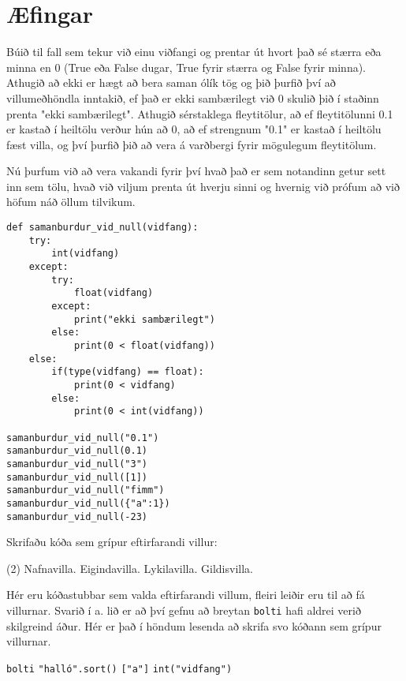 



\newpage
\section{Æfingar}
\begin{exercise}\label{vil1}
Búið til fall sem tekur við einu viðfangi og prentar út hvort það sé stærra eða minna en 0 (True eða False dugar, True fyrir stærra og False fyrir minna).
Athugið að ekki er hægt að bera saman ólík tög og þið þurfið því að villumeðhöndla inntakið, ef það er ekki sambærilegt við 0 skulið þið í staðinn prenta "ekki sambærilegt".
Athugið sérstaklega fleytitölur, að ef fleytitölunni 0.1 er kastað í heiltölu verður hún að 0, að ef strengnum "0.1" er kastað í heiltölu fæst villa, og því þurfið þið að vera á varðbergi fyrir mögulegum fleytitölum.
\end{exercise}
\begin{Answer}[ref={vil1}]
Nú þurfum við að vera vakandi fyrir því hvað það er sem notandinn getur sett inn sem tölu, hvað við viljum prenta út hverju sinni og hvernig við prófum að við höfum náð öllum tilvikum.
	\begin{lstlisting}
def samanburdur_vid_null(vidfang):
	try:
		int(vidfang)
	except:
		try:
			float(vidfang)
		except:
			print("ekki sambærilegt")
		else:
			print(0 < float(vidfang))
	else:
		if(type(vidfang) == float):
			print(0 < vidfang)
		else:
			print(0 < int(vidfang))

samanburdur_vid_null("0.1")
samanburdur_vid_null(0.1)
samanburdur_vid_null("3")
samanburdur_vid_null([1])
samanburdur_vid_null("fimm")
samanburdur_vid_null({"a":1})
samanburdur_vid_null(-23)
	\end{lstlisting}
\end{Answer}

\begin{exercise}\label{vil2}
Skrifaðu kóða sem grípur eftirfarandi villur:
	\begin{tasks}(2)
		\task\label{vil2-a} Nafnavilla.  
		\task\label{vil2-b} Eigindavilla.
		\task\label{vil2-c} Lykilavilla.
		\task\label{vil2-d} Gildisvilla.
	\end{tasks}
\end{exercise}
\begin{Answer}[ref={vil2}]
Hér eru kóðastubbar sem valda eftirfarandi villum, fleiri leiðir eru til að fá villurnar.
Svarið í a. lið er að því gefnu að breytan \texttt{bolti} hafi aldrei verið skilgreind áður.
Hér er það í höndum lesenda að skrifa svo kóðann sem grípur villurnar.
\begin{tasks}
	\task \texttt{bolti}
	\task \texttt{"halló".sort()}
	\task \texttt{{}["a"]} 
	\task \texttt{int("vidfang")}
\end{tasks}
\end{Answer}